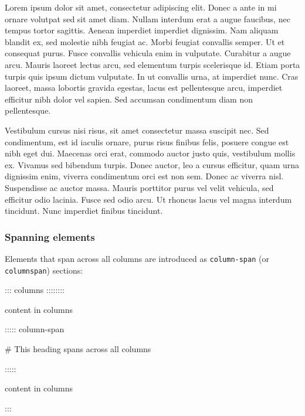 \documentclass[
]{article}
\newenvironment{Shaded}{}{}
\newcommand{\NormalTok}[1]{#1}
\begin{document}
{\raggedcolumns\setlength{\columnsep}{4em}
\setlength{\columnseprule}{ 3pt}
\renewcommand{\columnseprulecolor}{\color{blue}}
\begin{multicols}{3}

Lorem ipsum dolor sit amet, consectetur adipiscing elit. Donec a ante in
mi ornare volutpat sed sit amet diam. Nullam interdum erat a augue
faucibus, nec tempus tortor sagittis. Aenean imperdiet imperdiet
dignissim. Nam aliquam blandit ex, sed molestie nibh feugiat ac. Morbi
feugiat convallis semper. Ut et consequat purus. Fusce convallis
vehicula enim in vulputate. Curabitur a augue arcu. Mauris laoreet
lectus arcu, sed elementum turpis scelerisque id. Etiam porta turpis
quis ipsum dictum vulputate. In ut convallis urna, at imperdiet nunc.
Cras laoreet, massa lobortis gravida egestas, lacus est pellentesque
arcu, imperdiet efficitur nibh dolor vel sapien. Sed accumsan
condimentum diam non pellentesque.

Vestibulum cursus nisi risus, sit amet consectetur massa suscipit nec.
Sed condimentum, est id iaculis ornare, purus risus finibus felis,
posuere congue est nibh eget dui. Maecenas orci erat, commodo auctor
justo quis, vestibulum mollis ex. Vivamus sed bibendum turpis. Donec
auctor, leo a cursus efficitur, quam urna dignissim enim, viverra
condimentum orci est non sem. Donec ac viverra nisl. Suspendisse ac
auctor massa. Mauris porttitor purus vel velit vehicula, sed efficitur
odio lacinia. Fusce sed odio arcu. Ut rhoncus lacus vel magna interdum
tincidunt. Nunc imperdiet finibus tincidunt.

\end{multicols}
}

\hypertarget{spanning-elements}{%
\subsubsection{Spanning elements}\label{spanning-elements}}

Elements that span across all columns are introduced as
\texttt{column-span} (or \texttt{columnspan}) sections:

\begin{Shaded}
\begin{Highlighting}[]
\NormalTok{::: columns ::::::::}

\NormalTok{content in columns}

\NormalTok{::::: column{-}span}

\NormalTok{\# This heading spans across all columns}

\NormalTok{:::::}

\NormalTok{content in columns}

\NormalTok{:::}
\end{Highlighting}
\end{Shaded}
\end{document}
